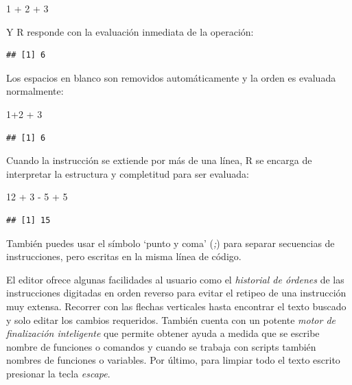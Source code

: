 \documentclass[
]{book}
\newenvironment{Shaded}{\begin{snugshade}}{\end{snugshade}}
\newcommand{\DecValTok}[1]{\textcolor[rgb]{0.00,0.00,0.81}{#1}}
\newcommand{\SpecialCharTok}[1]{\textcolor[rgb]{0.00,0.00,0.00}{#1}}
\begin{document}
\begin{Shaded}
\begin{Highlighting}[]
\DecValTok{1} \SpecialCharTok{+} \DecValTok{2} \SpecialCharTok{+} \DecValTok{3}
\end{Highlighting}
\end{Shaded}

Y R responde con la evaluación inmediata de la operación:

\begin{verbatim}
## [1] 6
\end{verbatim}

Los espacios en blanco son removidos automáticamente y la orden es evaluada normalmente:

\begin{Shaded}
\begin{Highlighting}[]
\DecValTok{1}\SpecialCharTok{+}\DecValTok{2}         \SpecialCharTok{+}       \DecValTok{3}
\end{Highlighting}
\end{Shaded}

\begin{verbatim}
## [1] 6
\end{verbatim}

Cuando la instrucción se extiende por más de una línea, R se encarga de interpretar la estructura y completitud para ser evaluada:

\begin{Shaded}
\begin{Highlighting}[]
\DecValTok{12} \SpecialCharTok{+} \DecValTok{3} \SpecialCharTok{{-}} 
  \DecValTok{5} \SpecialCharTok{+} 
  \DecValTok{5}
\end{Highlighting}
\end{Shaded}

\begin{verbatim}
## [1] 15
\end{verbatim}

También puedes usar el símbolo `punto y coma' (\emph{;}) para separar secuencias de instrucciones, pero escritas en la misma línea de código.

El editor ofrece algunas facilidades al usuario como el \emph{historial de órdenes} de las instrucciones digitadas en orden reverso para evitar el retipeo de una instrucción muy extensa. Recorrer con las flechas verticales hasta encontrar el texto buscado y solo editar los cambios requeridos. También cuenta con un potente \emph{motor de finalización inteligente} que permite obtener ayuda a medida que se escribe nombre de funciones o comandos y cuando se trabaja con scripts también nombres de funciones o variables. Por último, para limpiar todo el texto escrito presionar la tecla \emph{escape}.
\end{document}
